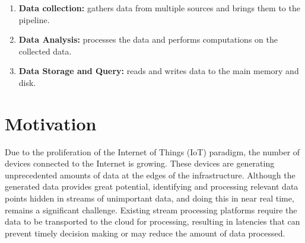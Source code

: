 \begin{enumerate}
\item \textbf{Data collection:} gathers data from multiple sources and brings them to the pipeline.
\item \textbf{Data Analysis:} processes the data and performs computations on the collected data.   
\item \textbf{Data Storage and Query:} reads and writes data to the main memory and disk.
\end{enumerate}

\section{Motivation}

Due to the proliferation of the Internet of Things (IoT) paradigm, the number of devices connected to the Internet is growing. These devices are generating unprecedented amounts of data at the edges of the infrastructure. Although the generated data provides great potential, identifying and processing relevant data points hidden in streams of unimportant data, and doing this in near real time, remains a significant challenge. Existing stream processing platforms require the data to be transported to the cloud for processing, resulting in latencies that can prevent timely decision making or may reduce the amount of data processed.




